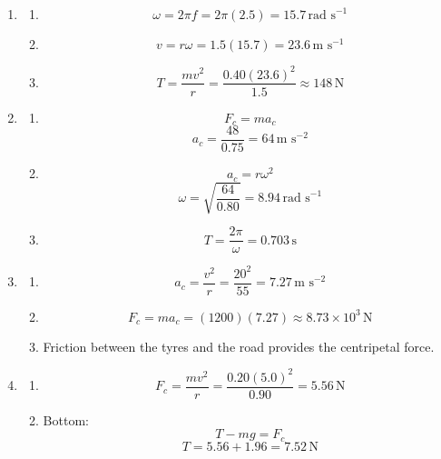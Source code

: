 \documentclass[12pt]{article}
\begin{document}
\begin{enumerate}[label=\textbf{\arabic*.}, itemsep=2em]

\item
\begin{enumerate}[label=(\alph*)]
    \item
    \[
    \omega = 2\pi f = 2\pi(2.5)=15.7\,\text{rad s}^{-1}
    \]

    \item
    \[
    v=r\omega = 1.5(15.7)=23.6\,\text{m s}^{-1}
    \]

    \item
    \[
    T=\frac{mv^2}{r}
    =\frac{0.40(23.6)^2}{1.5}
    \approx 148\,\text{N}
    \]
\end{enumerate}

\item
\begin{enumerate}[label=(\alph*)]
    \item
    \[
    F_c=ma_c
    \]
    \[
    a_c=\frac{48}{0.75}=64\,\text{m s}^{-2}
    \]

    \item
    \[
    a_c=r\omega^2
    \]
    \[
    \omega=\sqrt{\frac{64}{0.80}}
    =8.94\,\text{rad s}^{-1}
    \]

    \item
    \[
    T=\frac{2\pi}{\omega}
    =0.703\,\text{s}
    \]
\end{enumerate}

\item
\begin{enumerate}[label=(\alph*)]
    \item
    \[
    a_c=\frac{v^2}{r}
    =\frac{20^2}{55}
    =7.27\,\text{m s}^{-2}
    \]

    \item
    \[
    F_c=ma_c
    =(1200)(7.27)
    \approx 8.73\times10^3\,\text{N}
    \]

    \item Friction between the tyres and the road provides the centripetal force.
\end{enumerate}

\item
\begin{enumerate}[label=(\alph*)]
    \item
    \[
    F_c=\frac{mv^2}{r}
    =\frac{0.20(5.0)^2}{0.90}
    =5.56\,\text{N}
    \]

    \item Bottom:
    \[
    T-mg=F_c
    \]
    \[
    T=5.56+1.96
    =7.52\,\text{N}
    \]


\end{enumerate}
\end{enumerate}
\end{document}
